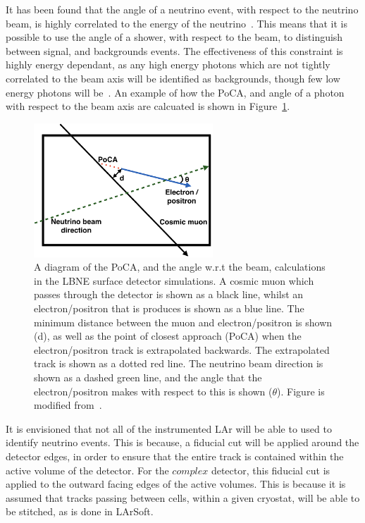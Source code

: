 It has been found that the angle of a neutrino event, with respect to the neutrino beam, is highly correlated to the energy of the neutrino~\citep{barker2012muon}. This means that it is possible to use the angle of a shower, with respect to the beam, to distinguish between signal, and backgrounds events. The effectiveness of this constraint is highly energy dependant, as any high energy photons which are not tightly correlated to the beam axis will be identified as backgrounds, though few low energy photons will be~\citep{LBNE6621}. An example of how the PoCA, and angle of a photon with respect to the beam axis are calcuated is shown in Figure~\ref{fig:SurfPoCACut}. \\

\begin{figure}
  \centering
  \includegraphics[width=0.6\textwidth]{PoCA_Beam_Cuts}
  \caption[A diagram of the PoCA, and the angle w.r.t the beam, calculations in the LBNE surface detector simulations]
          {A diagram of the PoCA, and the angle w.r.t the beam, calculations in the LBNE surface detector simulations. A cosmic muon which passes through the detector is shown as a black line, whilst an electron/positron that is produces is shown as a blue line. The minimum distance between the muon and electron/positron is shown (d), as well as the point of closest approach (PoCA) when the electron/positron track is extrapolated backwards. The extrapolated track is shown as a dotted red line. The neutrino beam direction is shown as a dashed green line, and the angle that the electron/positron makes with respect to this is shown ($\theta$). Figure is modified from~\citep{MartinsThesis}.}
  \label{fig:SurfPoCACut}
\end{figure}

It is envisioned that not all of the instrumented LAr will be able to used to identify neutrino events. This is because, a fiducial cut will be applied around the detector edges, in order to ensure that the entire track is contained within the active volume of the detector. For the $complex$ detector, this fiducial cut is applied to the outward facing edges of the active volumes. This is because it is assumed that tracks passing between cells, within a given cryostat, will be able to be stitched, as is done in LArSoft. \\

